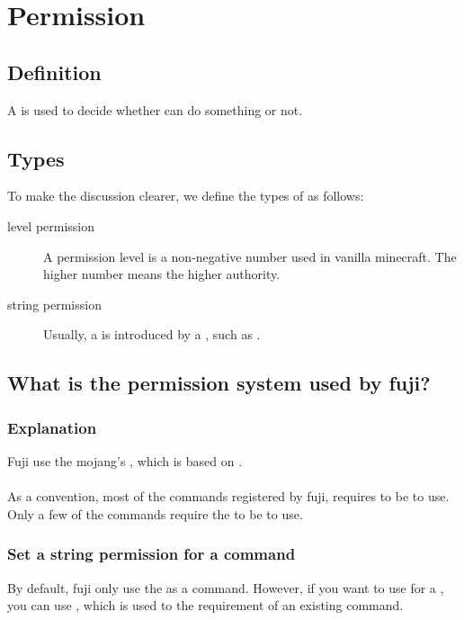 \chapter{Permission}\label{ch:permission}
\section{Definition}
A  is used to decide whether  can do something or not.


\section{Types}
To make the discussion clearer, we define the types of  as follows:
\begin{description}
    \item [level permission] A permission level is a non-negative number used in vanilla minecraft.
    The higher number means the higher authority.
    \item[string permission] Usually, a  is introduced by a , such as .
\end{description}

\clearpage


\section{What is the permission system used by fuji?}

\subsection{Explanation}
Fuji use the mojang's , which is based on .\\
\\
As a convention, most of the commands registered by fuji, requires  to be  to use.
Only a few of the commands require the  to be  to use.

\subsection{Set a string permission for a command}
By default, fuji only use the  as  a command.
However, if you want to use  for a , you can use , which is used to  the requirement of an existing command.


